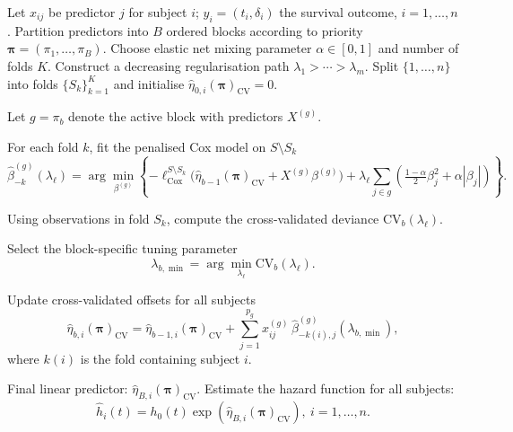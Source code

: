 {\small
\begin{algorithm}[htbp]

\caption{Fitting Cox regression with Priority Elastic Net penalty}
\label{alg:priority_elastic_net}
\begin{algorithmic}[1]

\STATE Let $x_{ij}$ be predictor $j$ for subject $i$; $y_i=(t_i,\delta_i)$ the survival outcome, $i=1,\ldots,n$.
\STATE Partition predictors into $B$ ordered blocks according to priority $\bm{\pi}=(\pi_1,\dots,\pi_B)$.
\STATE Choose elastic net mixing parameter $\alpha\in[0,1]$ and number of folds $K$.
\STATE Construct a decreasing regularisation path $\lambda_1>\cdots>\lambda_m$.
\STATE Split $\{1,\ldots,n\}$ into folds $\{S_k\}_{k=1}^K$ and initialise $\hat{\eta}_{0,i}(\bm{\pi})_{\mathrm{CV}}=0$.

    \STATE Let $g=\pi_b$ denote the active block with predictors $X^{(g)}$.

        \STATE For each fold $k$, fit the penalised Cox model on $S\setminus S_k$
        \[
        \hat{\beta}^{(g)}_{-k}(\lambda_\ell)
        =
        \arg\min_{\beta^{(g)}}
        \left\{
        -\ell_{\mathrm{Cox}}^{S\setminus S_k}\!\big(\hat{\eta}_{b-1}(\bm{\pi})_{\mathrm{CV}} + X^{(g)}\beta^{(g)}\big)
        +
        \lambda_\ell \sum_{j\in g}\!\left(\tfrac{1-\alpha}{2}\beta_j^2+\alpha|\beta_j|\right)
        \right\}.
        \]

        \STATE Using observations in fold $S_k$, compute the cross-validated deviance $\mathrm{CV}_b(\lambda_\ell)$.
    \ENDFOR

    \STATE Select the block-specific tuning parameter
    \[
    \lambda_{b,\min}=\arg\min_{\lambda_\ell}\mathrm{CV}_b(\lambda_\ell).
    \]

    \STATE Update cross-validated offsets for all subjects
    \[
    \hat{\eta}_{b,i}(\bm{\pi})_{\mathrm{CV}}
    =
    \hat{\eta}_{b-1,i}(\bm{\pi})_{\mathrm{CV}}
    +
    \sum_{j=1}^{p_g} x^{(g)}_{ij}\,\hat{\beta}^{(g)}_{-k(i),j}(\lambda_{b,\min}),
    \]
    where $k(i)$ is the fold containing subject $i$.
\ENDFOR

\STATE Final linear predictor: $\hat{\eta}_{B,i}(\bm{\pi})_{\mathrm{CV}}$.
\STATE Estimate the hazard function for all subjects:
\[
\hat{h}_i(t)=h_0(t)\exp\!\left(\hat{\eta}_{B,i}(\bm{\pi})_{\mathrm{CV}}\right), \ i=1,\ldots, n.
\]

\end{algorithmic}
\end{algorithm}
}

